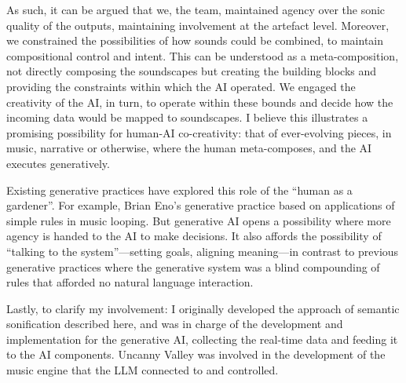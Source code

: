 As such, it can be argued that we, the team, maintained agency over the sonic quality of the outputs, maintaining involvement at the artefact level. Moreover, we constrained the possibilities of how sounds could be combined, to maintain compositional control and intent. This can be understood as a meta-composition, not directly composing the soundscapes but creating the building blocks and providing the constraints within which the AI operated. We engaged the creativity of the AI, in turn, to operate within these bounds and decide how the incoming data would be mapped to soundscapes. I believe this illustrates a promising possibility for human-AI co-creativity: that of ever-evolving pieces, in music, narrative or otherwise, where the human meta-composes, and the AI executes generatively.

Existing generative practices have explored this role of the “human as a gardener”. For example, Brian Eno’s generative practice based on applications of simple rules in music looping. But generative AI opens a possibility where more agency is handed to the AI to make decisions. It also affords the possibility of “talking to the system”—setting goals, aligning meaning—in contrast to previous generative practices where the generative system was a blind compounding of rules that afforded no natural language interaction.

Lastly, to clarify my involvement: I originally developed the approach of semantic sonification described here, and was in charge of the development and implementation for the generative AI, collecting the real-time data and feeding it to the AI components. Uncanny Valley was involved in the development of the music engine that the LLM connected to and controlled.







